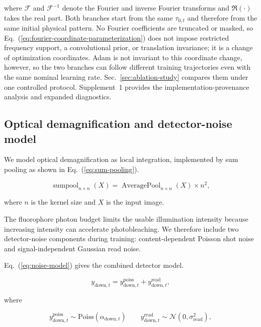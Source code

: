 \documentclass{optica-article}
\begin{document}
where $\mathcal{F}$ and $\mathcal{F}^{-1}$ denote the Fourier and inverse Fourier transforms and $\Re(\cdot)$ takes the real part. Both branches start from the same $\tau_{0,t}$ and therefore from the same initial physical pattern. No Fourier coefficients are truncated or masked, so Eq.~(\ref{eq:fourier-coordinate-parameterization}) does not impose restricted frequency support, a convolutional prior, or translation invariance; it is a change of optimization coordinates. Adam is not invariant to this coordinate change, however, so the two branches can follow different training trajectories even with the same nominal learning rate. Sec.~\ref{sec:ablation-study} compares them under one controlled protocol. Supplement~1 provides the implementation-provenance analysis and expanded diagnostics.

\subsection{Optical demagnification and detector-noise model}
We model optical demagnification as local integration, implemented by sum pooling as shown in Eq.~(\ref{eq:sum-pooling}).

\begin{equation}
    \operatorname{sumpool}_{n \times n}(X) = \operatorname{AveragePool}_{n \times n}(X) \times n^2,
    \label{eq:sum-pooling}
\end{equation}

where $n$ is the kernel size and $X$ is the input image.

The fluorophore photon budget limits the usable illumination intensity because increasing intensity can accelerate photobleaching. We therefore include two detector-noise components during training: content-dependent Poisson shot noise and signal-independent Gaussian read noise.

Eq.~(\ref{eq:noise-model}) gives the combined detector model.

\begin{equation}
    y_{\mathrm{down},t} = y^{\mathrm{poiss}}_{\mathrm{down},t} + y^{\mathrm{read}}_{\mathrm{down},t},
    \label{eq:noise-model}
\end{equation}

where

\begin{equation}
    y^{\mathrm{poiss}}_{\mathrm{down},t} \sim \mathrm{Poiss}(\alpha_{\mathrm{down},t})
    \qquad
    y^{\mathrm{read}}_{\mathrm{down},t} \sim \mathcal{N}(0, \sigma_{\mathrm{read}}^2),
    \label{eq:poisson-read-noise}
\end{equation}
\end{document}
